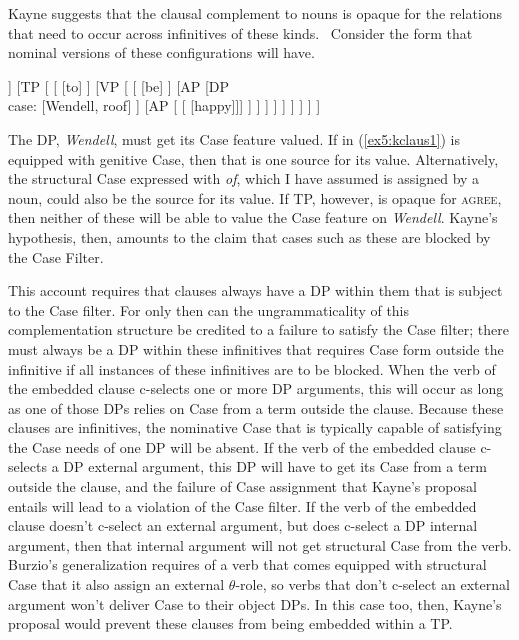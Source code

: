 Kayne suggests that the clausal complement to nouns is opaque for the relations that need to occur across infinitives of these kinds.%
%
%
%
\ Consider the form that nominal versions of these configurations will have.
\begin{fullwidth}
\begin{exe}
	\medskip
	\raggedright
	\ex \label{ex5:kclaus1} 
	\small
	\begin{forest}
	[\ibar{D}
		[\obar{D} ]
		[NP [\ibar{N}
			[\obar{N} [$\surd$appear\\ $\surd$consider] ]
			[TP [
				[ [to] ]
				[VP [ 
					[ [be] ]
					[AP 
						[DP\\ case: [Wendell, roof] ]
						[AP [ [ [happy]]] ]
					 ]
				] ]
			] ]
		] ]
	]
	\end{forest}
	\bigskip
\end{exe}
\end{fullwidth}
The DP, \emph{Wendell}, must get its Case feature valued. If  in (\ref{ex5:kclaus1}) is equipped with genitive Case, then that is one source for its value. Alternatively, the structural Case expressed with \emph{of}, which I have assumed is assigned by a noun, could also be the source for its value. If TP, however, is opaque for \textsc{agree}, then neither of these will be able to value the Case feature on \emph{Wendell}. Kayne's hypothesis, then, amounts to the claim that cases such as these are blocked by the Case Filter. 

This account requires that clauses always have a DP within them that is subject to the Case filter. For only then can the ungrammaticality of this complementation structure be credited to a failure to satisfy the Case filter; there must always be a DP within these infinitives that requires Case form outside the infinitive if all instances of these infinitives are to be blocked. When the verb of the embedded clause c-selects one or more DP arguments, this will occur as long as one of those DPs relies on Case from a term outside the clause. Because these clauses are infinitives, the nominative Case that is typically capable of satisfying the Case needs of one DP will be absent. If the verb of the embedded clause c-selects a DP external argument, this DP will have to get its Case from a term outside the clause, and the failure of Case assignment that Kayne's proposal entails will lead to a violation of the Case filter. If the verb of the embedded clause doesn't c-select an external argument, but does c-select a DP internal argument, then that internal argument will not get structural Case from the verb. Burzio's generalization requires of a verb that comes equipped with structural Case that it also assign an external $\theta$-role, so verbs that don't c-select an external argument won't deliver Case to their object DPs. In this case too, then, Kayne's proposal would prevent these clauses from being embedded within a TP. 

